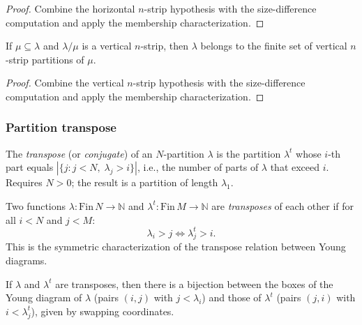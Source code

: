 \begin{proof}
Combine the horizontal $n$-strip hypothesis with the size-difference computation
and apply the membership characterization.
\end{proof}

\begin{lemma}
\label{lem.sf.mem-vertical-of-isVerticalNStrip}
\leanhelper
\leanok
If $\mu \subseteq \lambda$ and $\lambda/\mu$ is a vertical $n$-strip,
then $\lambda$ belongs to the finite set of vertical $n$-strip partitions of $\mu$.
\end{lemma}

\begin{proof}
\leanok
Combine the vertical $n$-strip hypothesis with the size-difference computation
and apply the membership characterization.
\end{proof}

\subsubsection{Partition transpose}

\begin{definition}
\label{def.sf.npartition-transpose}
\leanhelper
\leanok
The \emph{transpose} (or \emph{conjugate}) of an $N$-partition $\lambda$
is the partition $\lambda^t$ whose $i$-th part equals
$|\{j : j < N,\; \lambda_j > i\}|$,
i.e., the number of parts of $\lambda$ that exceed $i$.
Requires $N > 0$; the result is a partition of length $\lambda_1$.
\end{definition}

\begin{definition}
\label{def.sf.is-transpose}
\leanhelper
\leanok
Two functions $\lambda : \mathrm{Fin}\,N \to \mathbb{N}$ and
$\lambda^t : \mathrm{Fin}\,M \to \mathbb{N}$ are \emph{transposes} of each other
if for all $i < N$ and $j < M$:
\[
\lambda_i > j \iff \lambda^t_j > i.
\]
This is the symmetric characterization of the transpose relation
between Young diagrams.
\end{definition}

\begin{lemma}
\label{lem.sf.transpose-box-equiv}
\leanhelper
\leanok
If $\lambda$ and $\lambda^t$ are transposes, then there is a bijection
between the boxes of the Young diagram of $\lambda$ (pairs $(i,j)$
with $j < \lambda_i$) and those of $\lambda^t$ (pairs $(j,i)$ with
$i < \lambda^t_j$), given by swapping coordinates.
\end{lemma}


